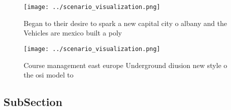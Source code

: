 \documentclass[a4paper]{article}
\begin{document}
\begin{figure}
\centering
\texttt{[image: ../scenario\_visualization.png]}
\caption{Began to their desire to spark a new capital city o albany and the Vehicles are mexico built a poly
}
\end{figure}
 
\begin{figure}
\centering
\texttt{[image: ../scenario\_visualization.png]}
\caption{Course management east europe Underground diusion new style o the osi model to 
}
\end{figure}
 
\subsection{SubSection}
\end{document}
